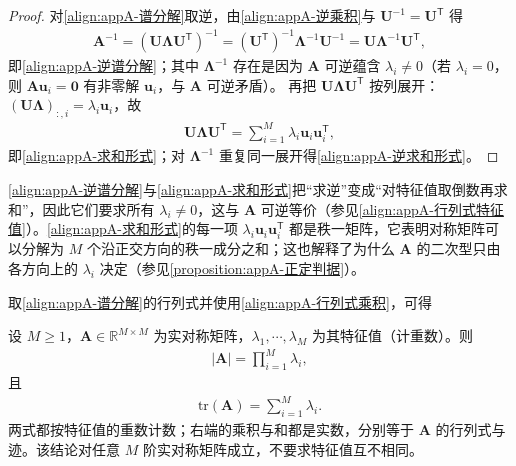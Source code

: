\documentclass[../main.tex]{subfiles}
\begin{document}
\begin{proof}
对\eqref{align:appA-谱分解}取逆，由\eqref{align:appA-逆乘积}与 $\bm{U}^{-1}=\bm{U}^{\mathsf{T}}$ 得
\begin{align*}
 \bm{A}^{-1}=(\bm{U}\bm{\Lambda}\bm{U}^{\mathsf{T}})^{-1}=(\bm{U}^{\mathsf{T}})^{-1}\bm{\Lambda}^{-1}\bm{U}^{-1}=\bm{U}\bm{\Lambda}^{-1}\bm{U}^{\mathsf{T}},
\end{align*}
即\eqref{align:appA-逆谱分解}；其中 $\bm{\Lambda}^{-1}$ 存在是因为 $\bm{A}$ 可逆蕴含 $\lambda_i\neq0$（若 $\lambda_i=0$，则 $\bm{A}\bm{u}_i=\bm{0}$ 有非零解 $\bm{u}_i$，与 $\bm{A}$ 可逆矛盾）。
再把 $\bm{U}\bm{\Lambda}\bm{U}^{\mathsf{T}}$ 按列展开：$(\bm{U}\bm{\Lambda})_{:,i}=\lambda_i\bm{u}_i$，故
\begin{align*}
 \bm{U}\bm{\Lambda}\bm{U}^{\mathsf{T}}=\sum_{i=1}^{M}\lambda_i\bm{u}_i\bm{u}_i^{\mathsf{T}},
\end{align*}
即\eqref{align:appA-求和形式}；对 $\bm{\Lambda}^{-1}$ 重复同一展开得\eqref{align:appA-逆求和形式}。
\end{proof}

\begin{remark}
\eqref{align:appA-逆谱分解}与\eqref{align:appA-求和形式}把“求逆”变成“对特征值取倒数再求和”，因此它们要求所有 $\lambda_i\neq0$，这与 $\bm{A}$ 可逆等价（参见\eqref{align:appA-行列式特征值}）。\eqref{align:appA-求和形式}的每一项 $\lambda_i\bm{u}_i\bm{u}_i^{\mathsf{T}}$ 都是秩一矩阵，它表明对称矩阵可以分解为 $M$ 个沿正交方向的秩一成分之和；这也解释了为什么 $\bm{A}$ 的二次型只由各方向上的 $\lambda_i$ 决定（参见\cref{proposition:appA-正定判据}）。
\end{remark}

取\eqref{align:appA-谱分解}的行列式并使用\eqref{align:appA-行列式乘积}，可得
\begin{proposition}[行列式与迹的特征值表示]\label{proposition:appA-行列式与迹}
设 $M\geqslant1$，$\bm{A}\in\mathbb{R}^{M\times M}$ 为实对称矩阵，$\lambda_1,\cdots,\lambda_M$ 为其特征值（计重数）。则
\begin{align}
  |\bm{A}|=\prod_{i=1}^{M}\lambda_i,
  \label{align:appA-行列式特征值}
\end{align}
且
\begin{align}
  \mathrm{tr}(\bm{A})=\sum_{i=1}^{M}\lambda_i.
  \label{align:appA-迹特征值}
\end{align}
两式都按特征值的重数计数；右端的乘积与和都是实数，分别等于 $\bm{A}$ 的行列式与迹。该结论对任意 $M$ 阶实对称矩阵成立，不要求特征值互不相同。
\end{proposition}
\end{document}
